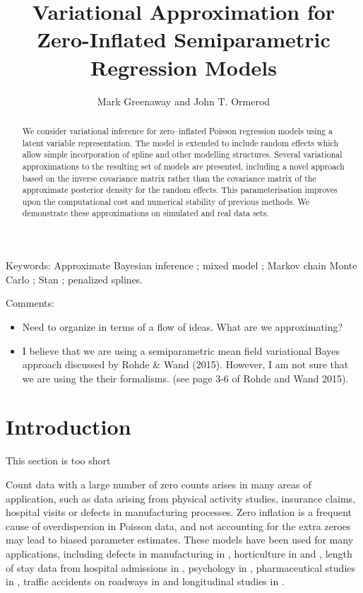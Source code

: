 \documentclass{amsart}[12pt]
\newcommand{\mgc}[1]{{\color{blue}#1}}
\newcommand{\joc}[1]{{\color{red}#1}}
\begin{document}
\title{Variational Approximation for Zero-Inflated Semiparametric Regression Models}
\author{Mark Greenaway and John T. Ormerod}

\begin{abstract}
	\noindent We consider variational inference for zero--inflated Poisson regression models using a latent
	variable representation. The model is extended to include random effects which allow simple incorporation of
	spline and other modelling structures. Several variational approximations to the resulting set of models are
	presented, including a novel approach based on the inverse covariance matrix rather than the covariance matrix
	of the approximate posterior density for the random effects. This parameterisation improves upon the
	computational cost and numerical stability of previous methods. We demonstrate these approximations on
	simulated and real data sets.
\end{abstract}
 
\maketitle

\noindent Keywords: Approximate Bayesian inference ; mixed model ; Markov chain Monte Carlo ; Stan ; penalized splines.

\joc{
	Comments: 
	\begin{itemize}
		\item Need to organize in terms of a flow of ideas. What are we approximating?		      		      		      		      
		\item I believe that we are using a semiparametric mean field variational Bayes approach discussed by Rohde \& Wand (2015).
		      However, I am not sure that we are using the their formalisms. (see page 3-6 of Rohde and Wand 2015).
	\end{itemize}	
}

\section{Introduction}
\label{sec:introduction}

\mgc{This section is too short}

Count data with a large number of zero counts arises in many areas of application, such as data arising from
physical activity studies, insurance claims, hospital visits or defects in manufacturing processes. Zero
inflation is a frequent cause of overdispersion in Poisson data, and not accounting for the extra zeroes may
lead to biased parameter estimates. These models have been used for many applications, including defects in
manufacturing in \citep{lambert1992}, horticulture in \citep{BIOM:BIOM1030} and \citep{BIOM:BIOM1030}, length
of stay data from hospital admissions in \citep{BIMJ:BIMJ200390024}, psychology in \citep{JOFP:rethink},
pharmaceutical studies in \citep{Min01042005}, traffic accidents on roadways in \citep{Shankar1997829} and
longitudinal studies in \citep{LeeWangScottYauMcLachlan2006}.
\end{document}
